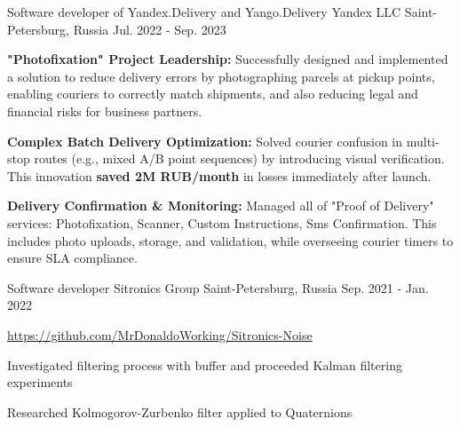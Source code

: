 \begin{cventries}
  \cventry
    {Software developer of Yandex.Delivery and Yango.Delivery} %
    {Yandex LLC} %
    {Saint-Petersburg, Russia} %
    {Jul. 2022 - Sep. 2023} %
    {
      \begin{cvitems} %
        \item {\textbf{"Photofixation" Project Leadership:} Successfully designed and implemented a solution to reduce delivery errors by photographing parcels at pickup points, enabling couriers to correctly match shipments, and also reducing legal and financial risks for business partners.}
        \item {\textbf{Complex Batch Delivery Optimization:} Solved courier confusion in multi-stop routes (e.g., mixed A/B point sequences) by introducing visual verification. This innovation \textbf{saved 2M RUB/month} in losses immediately after launch.}
        \item {\textbf{Delivery Confirmation \& Monitoring:} Managed all of "Proof of Delivery" services: Photofixation, Scanner, Custom Instructions, Sms Confirmation. This includes photo uploads, storage, and validation, while overseeing courier timers to ensure SLA compliance.}
      \end{cvitems}
    }


  \cventry
    {Software developer} %
    {Sitronics Group} %
    {Saint-Petersburg, Russia} %
    {Sep. 2021 - Jan. 2022} %
    {
      \begin{cvitems} %
        \item{\url{https://github.com/MrDonaldoWorking/Sitronics-Noise}}
        \item {Investigated filtering process with buffer and proceeded Kalman filtering experiments}
        \item {Researched Kolmogorov-Zurbenko filter applied to Quaternions}
      \end{cvitems}
    }

\end{cventries}
